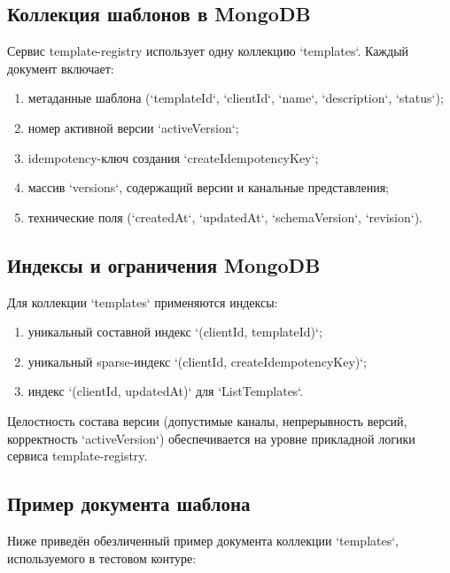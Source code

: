 \subsection{Коллекция шаблонов в MongoDB}

Сервис template-registry использует одну коллекцию `templates`.
Каждый документ включает:
\begin{enumerate}
    \item метаданные шаблона (`templateId`, `clientId`, `name`, `description`, `status`);
    \item номер активной версии `activeVersion`;
    \item idempotency-ключ создания `createIdempotencyKey`;
    \item массив `versions`, содержащий версии и канальные представления;
    \item технические поля (`createdAt`, `updatedAt`, `schemaVersion`, `revision`).
\end{enumerate}

\subsection{Индексы и ограничения MongoDB}

Для коллекции `templates` применяются индексы:
\begin{enumerate}
    \item уникальный составной индекс `(clientId, templateId)`;
    \item уникальный sparse-индекс `(clientId, createIdempotencyKey)`;
    \item индекс `(clientId, updatedAt)` для `ListTemplates`.
\end{enumerate}

Целостность состава версии (допустимые каналы, непрерывность версий,
корректность `activeVersion`) обеспечивается на уровне прикладной логики
сервиса template-registry.

\subsection{Пример документа шаблона}

Ниже приведён обезличенный пример документа коллекции `templates`,
используемого в тестовом контуре:

